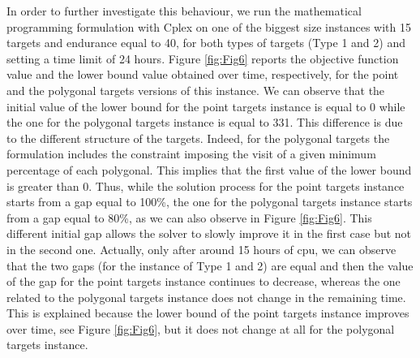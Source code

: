 \documentclass{itor}
\theoremstyle{definition}
\theoremstyle{remark}
\begin{document}

In order to further investigate this behaviour, we run the mathematical programming formulation with Cplex on one of the biggest size instances with 15 targets and endurance equal to 40, for both types of targets (Type 1 and 2) and setting a time limit of 24 hours. Figure \ref{fig:Fig6} reports the objective function value and the lower bound value obtained over time, respectively, for the point and the polygonal targets versions of this instance. We can observe that the initial value of the lower bound for the point targets instance is equal to 0 while the one for the polygonal targets instance is equal to 331. This difference is due to the different structure of the targets. Indeed, for the polygonal targets the formulation includes the constraint imposing the visit of a given minimum percentage of each polygonal. This implies that the first value of the lower bound is greater than 0. Thus, while the solution process for the point targets instance starts from a gap equal to 100\%, the one for the polygonal targets instance starts from a gap equal to 80\%, as we can also observe in Figure \ref{fig:Fig6}. This different initial gap allows the solver to slowly improve it in the first case but not in the second one. Actually, only after around 15 hours of cpu, we can observe that the two gaps (for the instance of Type 1 and 2) are equal and then the value of the gap for the point targets instance continues to decrease, whereas the one related to the polygonal targets instance does not change in the remaining time. This is explained because the lower bound of the point targets instance improves over time, see Figure \ref{fig:Fig6}, but it does not change at all for the polygonal targets instance.
\end{document}

